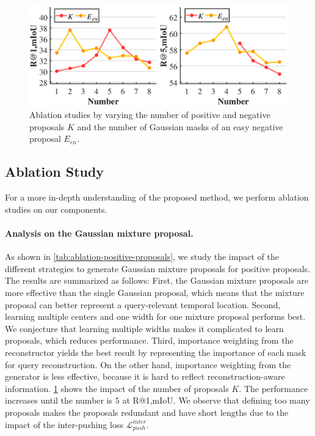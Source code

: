 \begin{figure}[t!]
  \centering
  \includegraphics[width=\linewidth]{figures/3-ablation-graph-props.pdf}
    \caption{Ablation studies by varying the number of positive and negative proposals $K$ and the number of Gaussian masks of an easy negative proposal $E_{en}$.
    }
    \label{fig:ablation-graph-props}
\end{figure}

\subsection{Ablation Study}
\label{sec:ablation-study}
For a more in-depth understanding of the proposed method, we perform ablation studies on our components.

\paragraph{Analysis on the Gaussian mixture proposal.}
As shown in \cref{tab:ablation-positive-proposals}, we study the impact of the different strategies to generate Gaussian mixture proposals for positive proposals.
The results are summarized as follows:
First, the Gaussian mixture proposals are more effective than the single Gaussian proposal, which means that the mixture proposal can better represent a query-relevant temporal location.
Second, learning multiple centers and one width for one mixture proposal performs best.
We conjecture that learning multiple widths makes it complicated to learn proposals, which reduces performance.
Third, importance weighting from the reconstructor yields the best result by representing the importance of each mask for query reconstruction.
On the other hand, importance weighting from the generator is less effective, because it is hard to reflect reconstruction-aware information.
\cref{fig:ablation-graph-props} shows the impact of the number of proposals $K$.
The performance increases until the number is $5$ at R@1,mIoU.
We observe that defining too many proposals makes the proposals redundant and have short lengths due to the impact of the inter-pushing loss $\mathcal{L}^{inter}_{push}$.


